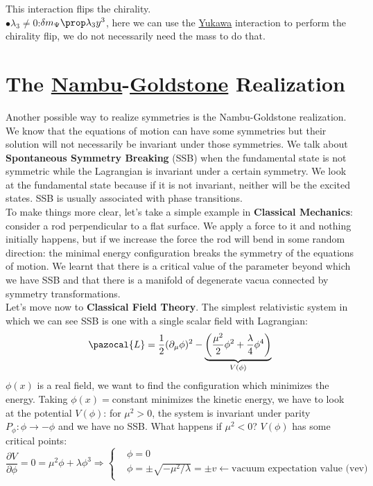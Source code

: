 \documentclass[../main.tex]{subfiles}
\begin{document}
\begin{exercise}
{    %
    }
This interaction flips the chirality.\\
$\bullet\lambda_3\neq0$:\;$\delta m_\Psi\prop\lambda_3y^3$, here we can use the \href{https://en.wikipedia.org/wiki/Hideki_Yukawa}{Yukawa} interaction to perform the chirality flip, we do not necessarily need the mass to do that.
\end{exercise}
\section{The \href{https://en.wikipedia.org/wiki/Yoichiro_Nambu}{Nambu}-\href{https://en.wikipedia.org/wiki/Jeffrey_Goldstone}{Goldstone} Realization}
Another possible way to realize symmetries is the Nambu-Goldstone realization. We know that the equations of motion can have some symmetries but their solution will not necessarily be invariant under those symmetries. We talk about \textbf{Spontaneous Symmetry Breaking} (SSB) when the fundamental state is not symmetric while the Lagrangian is invariant under a certain symmetry. We look at the fundamental state because if it is not invariant, neither will be the excited states. SSB is usually associated with phase transitions.\\
To make things more clear, let's take a simple example in \textbf{Classical Mechanics}: consider a rod perpendicular to a flat surface. We apply a force to it and nothing initially happens, but if we increase the force the rod will bend in some random direction: the minimal energy configuration breaks the symmetry of the equations of motion. We learnt that there is a critical value of the parameter beyond which we have SSB and that there is a manifold of degenerate vacua connected by symmetry transformations.\\
Let's move now to \textbf{Classical Field Theory}. The simplest relativistic system in which we can see SSB is one with a single scalar field with Lagrangian:
\[
\pazocal{L}=\frac{1}{2}(\partial_\mu\phi)^2-\underbrace{\left(\frac{\mu^2}{2}\phi^2+\frac{\lambda}{4}\phi^4\right)}_{V(\phi)}
\]
$\phi(x)$ is a real field, we want to find the configuration which minimizes the energy. Taking $\phi(x)=$constant minimizes the kinetic energy, we have to look at the potential $V(\phi)$: for $\mu^2>0$, the system is invariant under parity $P_\phi:\phi\to-\phi$ and we have no SSB. What happens if $\mu^2<0$? $V(\phi)$ has some critical points:
\[
\frac{\partial V}{\partial\phi}=0=\mu^2\phi+\lambda\phi^3\Rightarrow
\left\{
\begin{aligned}
&\phi=0\\
&\phi=\pm\sqrt{-\mu^2/\lambda}=\pm v\xleftarrow[]{}\text{vacuum expectation value (vev)}
\end{aligned}
\right.
\]
\end{document}
